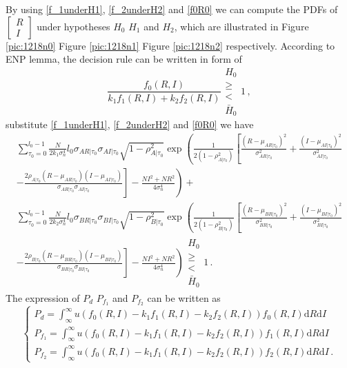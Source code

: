 By using \eqref{f_1underH1}, \eqref{f_2underH2} and \eqref{f0R0} we can compute the PDFs of  $\begin{bmatrix}
  R \\
  I
\end{bmatrix}$ under hypotheses $H_0$ $H_1$ and $H_2$, which are illustrated in Figure \ref{pic:1218n0} Figure \ref{pic:1218n1} Figure \ref{pic:1218n2} respectively. 
According to ENP lemma, the decision rule can be written in form of 
\begin{equation}
  \frac{f_0(R,I)}{k_1f_1(R,I)+k_2f_2(R,I)} \substack{H_0 \\ \geq \\ < \\ \bar{H}_0}1\,,
\end{equation}
substitute \eqref{f_1underH1}, \eqref{f_2underH2} and \eqref{f0R0} we have 
\begin{equation}
\begin{split}
\sum_{\tau_0=0}^{l_0-1}\frac{N}{2k_1\sigma_n^4}l_0\sigma_{AR|\tau_0}\sigma_{AI|\tau_0}\sqrt{1-\rho_{A|\tau_0}^2}\exp\left(\frac{1}{2(1-\rho_{A|\tau_0}^2)}\left[ \frac{(R-\mu_{AR|\tau_0})^2}{\sigma_{AR|\tau_0}^2}+\frac{(I-\mu_{AI|\tau_0})^2}{\sigma_{AI|\tau_0}^2} \right. \right. \\
\left. \left.  - \frac{2\rho_{A|\tau_0}(R-\mu_{AR|\tau_0})(I-\mu_{AI|\tau_0})}{\sigma_{AR|\tau_0}\sigma_{AI|\tau_0}} \right] -\frac{NI^2+NR^2}{4\sigma_n^4}\right)
+\\
\sum_{\tau_0=0}^{l_0-1}\frac{N}{2k_2\sigma_n^4}l_0\sigma_{BR|\tau_0}\sigma_{BI|\tau_0}\sqrt{1-\rho_{B|\tau_0}^2}\exp\left(
\frac{1}{2(1-\rho_{B|\tau_0}^2)}\left[ \frac{(R-\mu_{BR|\tau_0})^2}{\sigma_{BR|\tau_0}^2}+\frac{(I-\mu_{BI|\tau_0})^2}{\sigma_{BI|\tau_0}^2} \right. \right. \\
\left. \left. - \frac{2\rho_{B|\tau_0}(R-\mu_{BR|\tau_0})(I-\mu_{BI|\tau_0})}{\sigma_{BR|\tau_0}\sigma_{BI|\tau_0}}  
\right] -\frac{NI^2+NR^2}{4\sigma_n^4}
\right) \substack{H_0 \\ \geq \\ < \\ \bar{H}_0}1\,.
\end{split}
\end{equation}
The expression of $P_d$ $P_{f_1}$ and $P_{f_2}$ can be written as
\begin{equation}
  \begin{cases}
	P_d = \int_{\infty}^\infty u(f_0(R,I) - k_1f_1(R,I) - k_2f_2(R,I))f_0(R,I)\mathrm{d}R\mathrm{d}I\\ 
	P_{f_1} = \int_{\infty}^\infty u(f_0(R,I) - k_1f_1(R,I) - k_2f_2(R,I))f_1(R,I)\mathrm{d}R\mathrm{d}I\\
	P_{f_2} = \int_{\infty}^\infty u(f_0(R,I) - k_1f_1(R,I) - k_2f_2(R,I))f_2(R,I)\mathrm{d}R\mathrm{d}I\,. 
  \end{cases}
  \label{asdffghj}
\end{equation}

